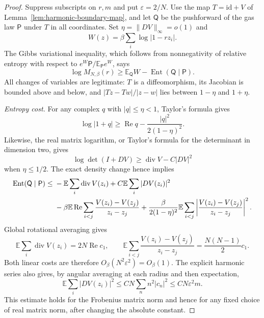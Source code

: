 \documentclass[11pt,a4paper]{article}
\numberwithin{equation}{section}
\theoremstyle{definition}
\theoremstyle{remark}
\begin{document}
\begin{proof}
Suppress subscripts on $r,m$ and put $\varepsilon=2/N$.
Use the map $T=\mathrm{id}+V$ of Lemma~\ref{lem:harmonic-boundary-map},
and let $\mathsf Q$ be the pushforward of the gas law $\mathsf P$ under
$T$ in all coordinates. Set $\eta=\|DV\|_\infty=o(1)$ and
\[
 W(z)=\beta\sum_i\log|1-rz_i|.
\]
The Gibbs variational inequality, which follows from nonnegativity of
relative entropy with respect to $e^W\mathsf P/\mathbb E_{\mathsf P}e^W$,
says
\begin{equation}
 \log M_{N,\beta}(r)
 \geq\mathbb E_{\mathsf Q}W-
                  \operatorname{Ent}(\mathsf Q\mid\mathsf P).
 \label{eq:harmonic-gibbs-variational}
\end{equation}
All changes of variables are legitimate: $T$ is a diffeomorphism,
its Jacobian is bounded above and below, and
$|Tz-Tw|/|z-w|$ lies between $1-\eta$ and $1+\eta$.

\emph{Entropy cost.}
For any complex $q$ with $|q|\leq\eta<1$,
Taylor's formula gives
\[
 \log|1+q|\geq\operatorname{Re}q-
                      \frac{|q|^2}{2(1-\eta)^2}.
\]
Likewise, the real matrix logarithm, or Taylor's formula for the
determinant in dimension two, gives
\[
 \log\det(I+DV)\geq\operatorname{div}V-C|DV|^2
\]
when $\eta\leq1/2$. The exact density change hence implies
\begin{align}
 \operatorname{Ent}(\mathsf Q\mid\mathsf P)
 \leq{}&-\mathbb E\sum_i\operatorname{div}V(z_i)
        +C\mathbb E\sum_i|DV(z_i)|^2\notag\\
 &-\beta\mathbb E\operatorname{Re}\sum_{i<j}
                  \frac{V(z_i)-V(z_j)}{z_i-z_j}
 +\frac\beta{2(1-\eta)^2}
       \mathbb E\sum_{i<j}
          \left|\frac{V(z_i)-V(z_j)}{z_i-z_j}\right|^2.
 \label{eq:harmonic-entropy-decomposition}
\end{align}
Global rotational averaging gives
\[
 \mathbb E\sum_i\operatorname{div}V(z_i)=2N\operatorname{Re}c_1,
 \qquad
 \mathbb E\sum_{i<j}\frac{V(z_i)-V(z_j)}{z_i-z_j}
 =\frac{N(N-1)}2c_1.
\]
Both linear costs are therefore $O_\beta(N^2\varepsilon^2)=O_\beta(1)$.
The explicit harmonic series also gives, by angular averaging at each
radius and then expectation,
\[
 \mathbb E\sum_i|DV(z_i)|^2
 \leq C N\sum_n n^2|c_n|^2
 \leq C N\varepsilon^2m.
\]
This estimate holds for the Frobenius matrix norm and hence for any
fixed choice of real matrix norm, after changing the absolute constant.


\end{proof}
\end{document}
